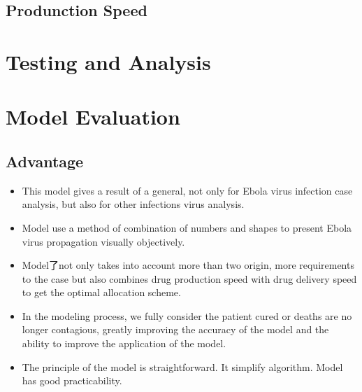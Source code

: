 \documentclass{icmmcm}
\begin{document}
\subsection{Produnction Speed}

\section{Testing and Analysis}


\section{Model Evaluation}
\subsection{Advantage}
\begin{itemize}
  \item This model gives a result of a general, not only for
  Ebola virus infection case analysis, but also for other
  infections virus analysis.
  \item Model use a method of combination of numbers and shapes
  to present Ebola virus propagation visually objectively.
  \item Model了not only takes into account more than two origin,
  more requirements to the case  but also combines drug
  production speed with drug delivery speed to get the optimal
  allocation scheme.
  \item In the modeling process, we fully consider the patient
  cured or deaths are no longer contagious, greatly improving
  the accuracy of the model and the ability to improve the
  application of the model.
  \item The principle of the model is straightforward. It
  simplify algorithm. Model has good practicability.
\end{itemize}
\end{document}

